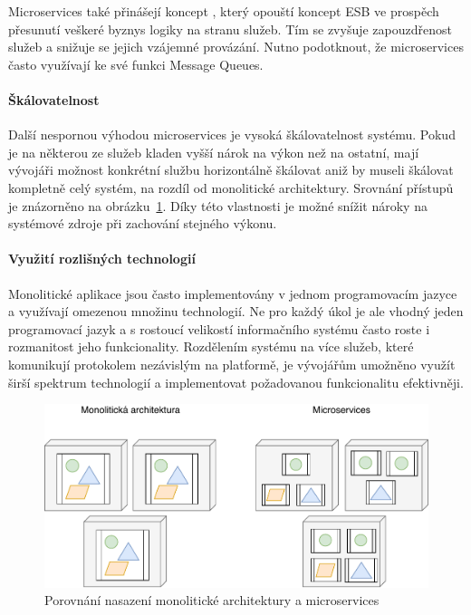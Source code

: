 Microservices také přinášejí koncept ,
který opouští koncept ESB ve prospěch přesunutí veškeré byznys logiky
na stranu služeb. Tím se zvyšuje zapouzdřenost služeb a snižuje se
jejich vzájemné provázání. Nutno podotknout, že microservices často
využívají ke své funkci Message Queues.

\paragraph{Škálovatelnost}
Další nespornou výhodou microservices je vysoká škálovatelnost systému. Pokud je na
některou ze služeb kladen vyšší nárok na výkon než na ostatní, mají
vývojáři možnost konkrétní službu horizontálně škálovat aniž by
museli škálovat kompletně celý systém, na rozdíl od monolitické architektury.
Srovnání přístupů je znázorněno na obrázku~\ref{fig:microservices-deployment}.
Díky této vlastnosti je možné snížit nároky na systémové zdroje při zachování
stejného výkonu.

\paragraph{Využití rozlišných technologií}
Monolitické aplikace jsou často implementovány v jednom programovacím jazyce
a využívají omezenou množinu technologií. Ne pro každý úkol je ale vhodný
jeden programovací jazyk a s rostoucí velikostí informačního systému často roste
i rozmanitost jeho funkcionality. Rozdělením systému na více služeb, které
komunikují protokolem nezávislým na platformě, je vývojářům umožněno využít
širší spektrum technologií a implementovat požadovanou funkcionalitu
efektivněji.

\begin{figure}
    \centering
    \includegraphics[keepaspectratio=true, width=0.8\linewidth]{figures/microservices-deployment.pdf}
    \caption{Porovnání nasazení monolitické architektury a microservices}
    \label{fig:microservices-deployment}
\end{figure}

